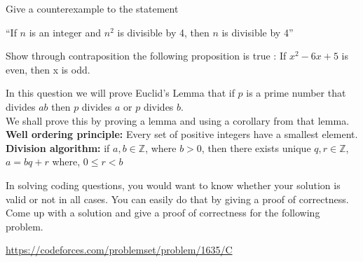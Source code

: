 \documentclass[addpoints]{exam}
\begin{document}
\begin{questions}
\question Give a counterexample to the statement
\begin{center}
    ``If $n$ is an integer and $n^2$ is divisible by 4, then $n$ is divisible by 4''
\end{center}
\begin{solution}
\end{solution}


\question
Show through contraposition the following proposition is true : If $x^{2} - 6x + 5$ is even, then x is odd.

\begin{solution}
\end{solution}




\question In this question we will prove Euclid's Lemma that if $p$ is a prime number that divides $ab$ then $p$ divides $a$ or $p$ divides $b$.
\\We shall prove this by proving a lemma and using a corollary from that lemma.
\\\textbf{Well ordering principle:} Every set of positive integers have a smallest element.
\\\textbf{Division algorithm:} if $a,b \in \mathbb{Z}$, where $b>0$, then there exists unique $q,r \in \mathbb{Z}$, $a=bq+r$ where, $0 \leq r <b$ 

\question In solving coding questions, you would want to know whether your solution is valid or not in all cases. You can easily do that by giving a proof of correctness. Come up with a solution and give a proof of correctness for the following problem.
\begin{center}
    \href{https://codeforces.com/problemset/problem/1635/C}{https://codeforces.com/problemset/problem/1635/C}
\end{center}
\begin{solution}

\end{solution}
\end{questions}
\end{document}
